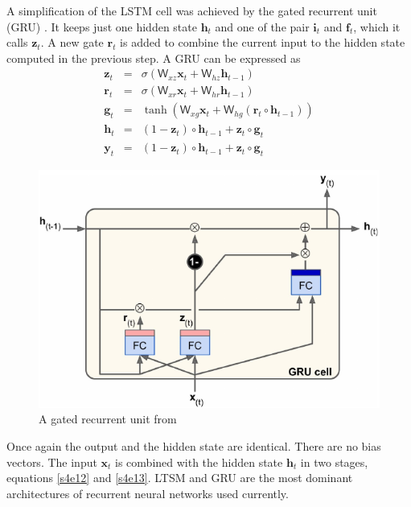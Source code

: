 \documentclass[11pt]{article}
\numberwithin{equation}{section}
\renewcommand{\vec}{\mathbf}
\newcommand{\mat}{\mathsf}
\begin{document}
A simplification of the LSTM cell was achieved by the gated recurrent unit
(GRU) \cite{cho2014learning}. It keeps just one hidden state $\vec{h}_t$ and
one of the pair $\vec{i}_t$ and $\vec{f}_t$, which it calls $\vec{z}_t$. A
new gate $\vec{r}_t$ is added to combine the current input to the hidden state
computed in the previous step. A GRU can be expressed as
\begin{eqnarray}
\vec{z}_t&=&\sigma\left(\mat{W}_{xz}\vec{x}_t+\mat{W}_{hz}\vec{h}_{t-1}\right) 
\label{s4e11} \\
\vec{r}_t&=&\sigma\left(\mat{W}_{xr}\vec{x}_t+\mat{W}_{hr}\vec{h}_{t-1}\right) 
\label{s4e12} \\
\vec{g}_t&=&\tanh\left(\mat{W}_{xg}\vec{x}_t+\mat{W}_{hg}(\vec{r}_t\circ
\vec{h}_{t-1})\right) \label{s4e13} \\
\vec{h}_t&=&(1 - \vec{z}_t)\circ\vec{h}_{t-1} + \vec{z}_t\circ\vec{g}_t
\label{s4e14} \\
\vec{y}_t&=&(1 - \vec{z}_t)\circ\vec{h}_{t-1} + \vec{z}_t\circ\vec{g}_t
\label{s4e15}
\end{eqnarray}

\begin{figure}
\centering
\includegraphics[scale=0.5]{gru}
\caption{A gated recurrent unit from \cite{geron2019hands}}\label{f6}
\end{figure}
Once again the output and the hidden state are identical. There are no bias
vectors. The input $\vec{x}_t$ is combined with the hidden state $\vec{h}_t$
in two stages, equations \eqref{s4e12} and \eqref{s4e13}. LTSM and GRU are the
most dominant architectures of recurrent neural networks used currently. 
\end{document}
